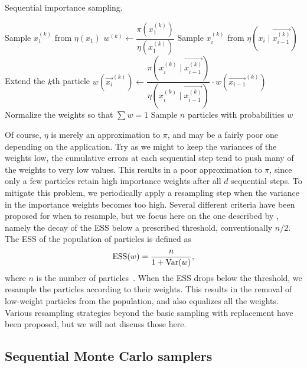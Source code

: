 \begin{algorithm}
  \caption{Sequential importance sampling.}
  \begin{algorithmic}
      \State Sample $x_1^{(k)}$ from $\eta(x_1)$
      \State $w^{(k)} \gets \dfrac{\pi\left(x_1^{(k)}\right)}{\eta\left(x_1^{(k)}\right)}$
    \EndFor
        \State Sample $x_i^{(k)}$ from $\eta\left(x_i \mid \vec{x_{i-1}^{(k)}}\right)$
        \Comment Extend the $k$th particle
        \State $w(\vec{x_i}^{(k)}) \gets \dfrac{\pi\left(x_i^{(k)} \mid \vec{x_{i-1}^{(k)}}\right)}{\eta\left(x_i^{(k)} \mid \vec{x_{i-1}^{(k)}}\right)} \cdot w(\vec{x_{i-1}}^{(k)})$
      \EndFor
      \State Normalize the weights so that $\sum w = 1$
    \EndFor
    \State Sample $n$ particles with probabilities $w$
  \end{algorithmic}
  \label{alg:sis}
\end{algorithm}

Of course, $\eta$ is merely an approximation to $\pi$, and may be a fairly poor
one depending on the application. Try as we might to keep the variances of the
weights low, the cumulative errors at each sequential step tend to push many of
the weights to very low values. This results in a poor approximation to $\pi$,
since only a few particles retain high importance weights after all $d$
sequential steps. To mitigate this problem, we periodically apply a resampling
step when the variance in the importance weights becomes too high. Several
different criteria have been proposed for when to resample, but we focus here
on the one described by \textcite{liu2008monte}, namely the decay of the
\gls{ESS} below a prescribed threshold, conventionally $n/2$. The \gls{ESS} of
the population of particles is defined as
\[
  \operatorname{ESS}(w) = \frac{n}{1 + \operatorname{Var}(w)},
\]
where $n$ is the number of particles~\autocite{liu2008monte}. When the
\gls{ESS} drops below the threshold, we resample the particles according to
their weights. This results in the removal of low-weight particles from the
population, and also equalizes all the weights. Various resampling strategies
beyond the basic sampling with replacement have been proposed, but we will not
discuss those here. 

\subsection{Sequential Monte Carlo samplers}
\label{subsec:smcsamp}

